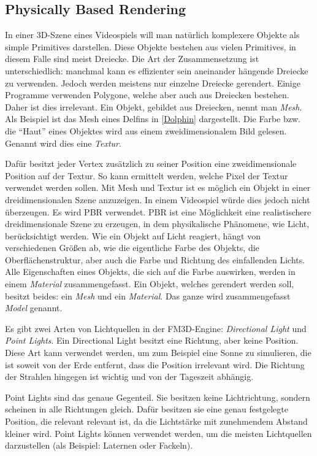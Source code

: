 \subsection{Physically Based Rendering}

In einer 3D-Szene eines Videospiels will man natürlich komplexere Objekte als simple Primitives darstellen. Diese Objekte bestehen aus vielen Primitives, in diesem Falle sind meist Dreiecke. 
Die Art der Zusammensetzung ist unterschiedlich: manchmal kann es effizienter sein aneinander hängende Dreiecke zu verwenden. Jedoch werden meistens nur einzelne Dreiecke gerendert. 
Einige Programme verwenden %
Polygone, welche aber auch aus Dreiecken bestehen. Daher ist dies irrelevant. 
Ein Objekt, gebildet aus Dreiecken, nennt man \textit{Mesh}. Als Beispiel ist das Mesh eines Delfins in \cref{Dolphin} dargestellt. Die Farbe bzw. die "`Haut"' eines Objektes wird aus einem zweidimensionalem Bild gelesen. Genannt wird dies eine \textit{Textur}.
 
Dafür besitzt jeder Vertex zusätzlich zu seiner Position eine zweidimensionale Position auf der Textur. So kann ermittelt werden, welche Pixel der Textur verwendet werden sollen.
Mit Mesh und Textur ist es möglich ein Objekt in einer dreidimensionalen Szene anzuzeigen. In einem Videospiel würde dies jedoch nicht überzeugen. Es wird \ac{PBR} verwendet. \ac{PBR} ist eine Möglichkeit eine realistischere dreidimensionale Szene zu erzeugen, in dem physikalische Phänomene, wie Licht, berücksichtigt werden. 
Wie ein Objekt auf Licht reagiert, hängt von verschiedenen Größen ab, wie die eigentliche Farbe des Objekts, die Oberflächenstruktur, aber auch die Farbe und Richtung des einfallenden Lichts. Alle Eigenschaften eines Objekts, die sich auf die Farbe auswirken, werden in einem \textit{Material} zusammengefasst. 
Ein Objekt, welches gerendert werden soll, besitzt beides: 
ein \textit{Mesh} und ein \textit{Material}. Das ganze wird zusammengefasst \textit{Model} genannt.

Es gibt zwei Arten von Lichtquellen in der FM3D-Engine: \textit{Directional Light} und \textit{Point Lights}. Ein Directional Light besitzt eine Richtung, aber keine Position. Diese Art kann verwendet werden, um zum Beispiel eine Sonne zu simulieren, die ist soweit von der Erde entfernt, dass die Position irrelevant wird. Die Richtung der Strahlen hingegen ist wichtig und von der Tageszeit abhängig. 

Point Lights sind das genaue Gegenteil. Sie besitzen keine Lichtrichtung, sondern scheinen in alle Richtungen gleich. Dafür besitzen sie eine genau festgelegte Position, die relevant relevant ist, da die Lichtstärke mit zunehmendem Abstand kleiner wird. Point Lights können verwendet werden, um die meisten Lichtquellen darzustellen (als Beispiel: Laternen oder Fackeln).


